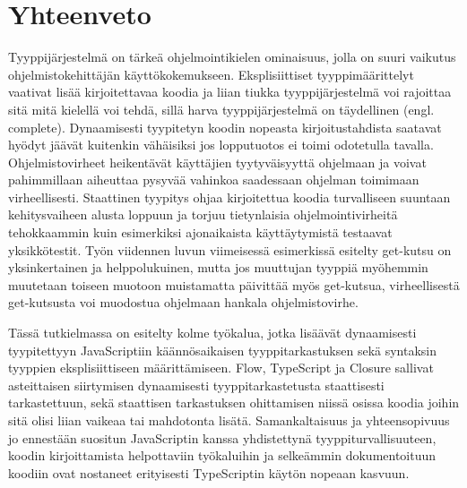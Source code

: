 \chapter{Yhteenveto}

Tyyppijärjestelmä on tärkeä ohjelmointikielen ominaisuus, jolla on suuri
vaikutus ohjelmistokehittäjän käyttökokemukseen.
Eksplisiittiset tyyppimäärittelyt vaativat lisää kirjoitettavaa koodia
ja liian tiukka tyyppijärjestelmä voi rajoittaa sitä mitä kielellä voi tehdä, sillä harva
tyyppijärjestelmä on täydellinen (engl. complete). 
Dynaamisesti tyypitetyn koodin nopeasta kirjoitustahdista saatavat hyödyt jäävät kuitenkin
vähäisiksi jos lopputuotos ei toimi odotetulla tavalla. Ohjelmistovirheet heikentävät
käyttäjien tyytyväisyyttä ohjelmaan ja voivat pahimmillaan aiheuttaa
pysyvää vahinkoa saadessaan ohjelman toimimaan virheellisesti.
Staattinen tyypitys ohjaa kirjoitettua koodia turvalliseen suuntaan kehitysvaiheen alusta
loppuun ja torjuu tietynlaisia ohjelmointivirheitä tehokkaammin kuin
esimerkiksi ajonaikaista käyttäytymistä testaavat yksikkötestit.
Työn viidennen luvun viimeisessä esimerkissä esitelty get-kutsu on yksinkertainen
ja helppolukuinen, mutta jos muuttujan  tyyppiä myöhemmin
muutetaan toiseen muotoon muistamatta päivittää myös get-kutsua, virheellisestä
get-kutsusta voi muodostua ohjelmaan hankala ohjelmistovirhe.

Tässä tutkielmassa on esitelty kolme työkalua, jotka lisäävät dynaamisesti
tyypitettyyn JavaScriptiin käännösaikaisen tyyppitarkastuksen sekä syntaksin
tyyppien eksplisiittiseen määrittämiseen. Flow, TypeScript ja Closure
sallivat asteittaisen siirtymisen dynaamisesti tyyppitarkastetusta staattisesti
tarkastettuun, sekä staattisen tarkastuksen ohittamisen niissä osissa koodia
joihin sitä olisi liian vaikeaa tai mahdotonta lisätä.
Samankaltaisuus ja yhteensopivuus jo ennestään suositun JavaScriptin kanssa
yhdistettynä tyyppiturvallisuuteen, koodin kirjoittamista helpottaviin
työkaluihin ja selkeämmin dokumentoituun koodiin ovat nostaneet erityisesti
TypeScriptin käytön nopeaan kasvuun.
